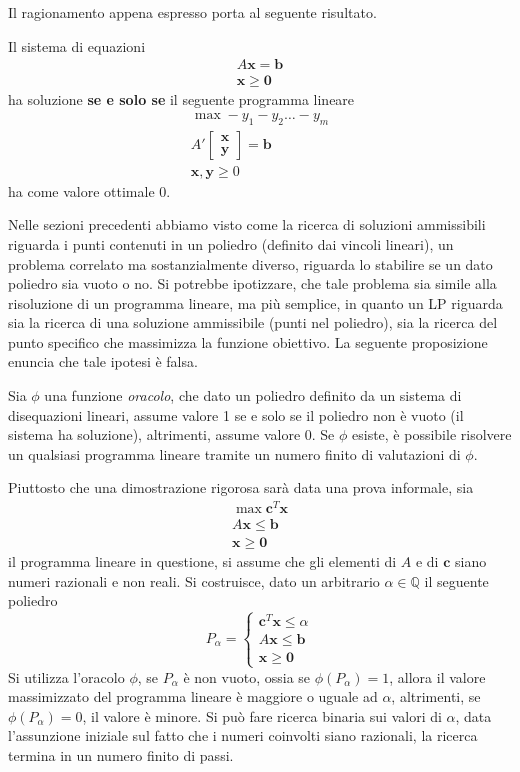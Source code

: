 \documentclass[10pt, letterpaper]{report}
\begin{document}
Il ragionamento appena espresso porta al seguente risultato.
\begin{proposizione}
    Il sistema di equazioni \begin{eqnarray*}
        A\mathbf x = \mathbf b \\ \mathbf x \ge \mathbf 0
    \end{eqnarray*}
    ha soluzione \textbf{se e solo se } il seguente programma lineare
    $$ \begin{matrix}
        \max -y_1-y_2\dots - y_m\\ 
        A'\begin{bmatrix}\mathbf x \\ \mathbf y \end{bmatrix}=\mathbf b\\ 
        \mathbf x,\mathbf y \ge 0 
    \end{matrix}$$
    ha come valore ottimale 0.
\end{proposizione}

Nelle sezioni precedenti abbiamo visto come la ricerca di soluzioni ammissibili riguarda i punti contenuti in un poliedro (definito dai vincoli lineari), un problema correlato ma sostanzialmente diverso, riguarda lo stabilire se un dato poliedro sia vuoto o no. Si potrebbe ipotizzare, che tale problema sia simile alla risoluzione di un programma lineare, ma più semplice, in quanto un LP riguarda sia la ricerca di una soluzione ammissibile (punti nel poliedro), sia la ricerca del punto specifico che massimizza la funzione obiettivo. La seguente proposizione enuncia che tale ipotesi è falsa.
\begin{proposizione}
  Sia $\phi$ una funzione \textit{oracolo}, che dato un poliedro definito da un sistema di disequazioni lineari, assume valore 1 se e solo se il poliedro non è vuoto (il sistema ha soluzione), altrimenti, assume valore 0. Se $\phi$ esiste, è possibile risolvere un qualsiasi programma lineare tramite un numero finito di valutazioni di $\phi$.
\end{proposizione}
Piuttosto che una dimostrazione rigorosa sarà data una prova informale, sia 
\begin{eqnarray*} \max \mathbf c^T\mathbf x\\
    A\mathbf x \le \mathbf b \\ \mathbf x \ge \mathbf 0
\end{eqnarray*}
il programma lineare in questione, si assume che gli elementi di $A$ e di $\mathbf c$ siano numeri razionali e non reali. Si costruisce, dato un arbitrario $\alpha\in\mathbb Q$ il seguente poliedro 
$$ 
P_\alpha = \begin{cases}
     \mathbf c^T\mathbf x\le \alpha\\
    A\mathbf x \le \mathbf b \\ \mathbf x \ge \mathbf 0
\end{cases}
$$
Si utilizza l'oracolo $\phi$, se $P_\alpha$ è non vuoto, ossia se $\phi(P_\alpha)=1$, allora il valore massimizzato del programma lineare è maggiore o uguale ad $\alpha$, altrimenti, se $\phi(P_\alpha)=0$, il valore è minore. Si può fare ricerca binaria sui valori di $\alpha$, data l'assunzione iniziale sul fatto che i numeri coinvolti siano razionali, la ricerca termina in un numero finito di passi.
\end{document}
